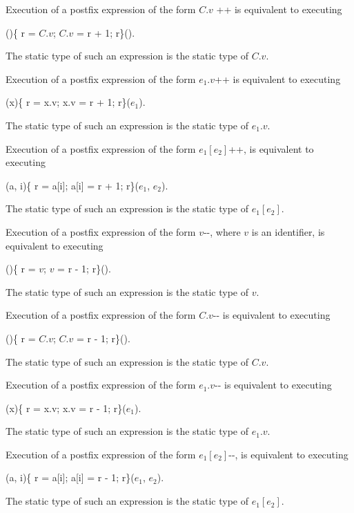 \documentclass{article}
\newcommand{\code}[1]{{\sf #1}}
\begin{document}
\LMHash{}
Execution of a postfix expression of the form \code{$C.v$ ++} is equivalent to executing

\code{()\{\VAR{} r = $C.v$; $C.v$ = r + 1; \RETURN{} r\}()}.

\LMHash{}
The static type of such an expression is the static type of $C.v$.


\LMHash{}
Execution of a postfix expression of the form \code{$e_1.v$++} is equivalent to executing

\code{(x)\{\VAR{} r = x.v; x.v = r + 1; \RETURN{} r\}($e_1$)}.

\LMHash{}
The static type of such an expression is the static type of $e_1.v$.


\LMHash{}
Execution of a postfix expression of the form \code{$e_1[e_2]$++},  is equivalent to executing

\code{(a, i)\{\VAR{} r = a[i]; a[i] = r + 1; \RETURN{} r\}($e_1$, $e_2$)}.

\LMHash{}
The static type of such an expression is the static type of $e_1[e_2]$.


\LMHash{}
Execution of a postfix expression of the form \code{$v$-{}-}, where $v$ is an identifier, is equivalent to executing

\code{()\{\VAR{} r = $v$; $v$ = r - 1; \RETURN{} r\}()}.

\LMHash{}
The static type of such an expression is the static type of $v$.


\LMHash{}
Execution of a postfix expression of the form \code{$C.v$-{}-} is equivalent to executing

\code{()\{\VAR{} r = $C.v$; $C.v$ = r - 1; \RETURN{} r\}()}.

\LMHash{}
The static type of such an expression is the static type of $C.v$.


\LMHash{}
Execution of a postfix expression of the form \code{$e_1.v$-{}-} is equivalent to executing

\code{(x)\{\VAR{} r = x.v; x.v = r - 1; \RETURN{} r\}($e_1$)}.

\LMHash{}
The static type of such an expression is the static type of $e_1.v$.


\LMHash{}
Execution of a postfix expression of the form \code{$e_1[e_2]$-{}-},  is equivalent to executing

\code{(a, i)\{\VAR{} r = a[i]; a[i] = r - 1; \RETURN{} r\}($e_1$, $e_2$)}.

\LMHash{}
The static type of such an expression is the static type of $e_1[e_2]$.
\end{document}
